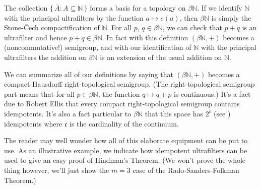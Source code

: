 \documentclass[12pt]{article}
\theoremstyle{plain}
\theoremstyle{definition}
\newcommand{\bbN}{\mathbb{N}}
\begin{document}
The collection $\{\, \overline{A} : A \subseteq \bbN \,\}$ forms a
basis for a topology on $\beta\bbN$.
If we identify $\bbN$ with the principal ultrafilters by the function
$a \mapsto e(a)$, then $\beta\bbN$ is simply the Stone-\v{C}ech
compactification of $\bbN$. 
For all $p$, $q \in \beta\bbN$, we can check that $p+q$ is an
ultrafilter and hence $p+q \in \beta\bbN$.
In fact with this definition $(\beta\bbN, +)$ becomes a (noncommutative!)
semigroup, and with our identification of $\bbN$ with the principal
ultrafilters the addition on $\beta\bbN$ is an extension of the usual
addition on $\bbN$. 

We can summarize all of our definitions by saying that $(\beta\bbN,
+)$ becomes a compact Hausdorff right-topological semigroup. 
(The right-topological semigroup part means that for all $p \in
\beta\bbN$, the function $q \mapsto q+p$ is continuous.)
It's a fact due to Robert Ellis that every compact right-topological
semigroup contains idempotents. 
It's also a fact particular to $\beta\bbN$ that this space has
$2^\mathfrak{c}$ (see \cite[Theorem 6.44]{Hindman:1998fk}) idempotents
where $\mathfrak{c}$ is the cardinality of the continuum. 

The reader may well wonder how all of this elaborate equipment can be
put to use. 
As an illustrative example, we indicate how idempotent ultrafilters
can be used to give an easy proof of Hindman's Theorem. 
(We won't prove the whole thing however, we'll just show the $m=3$
case of the Rado-Sanders-Folkman Theorem.)
\end{document}
